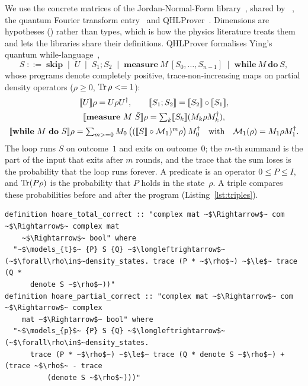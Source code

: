 We use the concrete matrices of the Jordan-Normal-Form library~\cite{thiemann2015jnf}, shared by
\IMD~\cite{bordg2021imd,bordg2020afp}, the quantum Fourier transform entry~\cite{manrique2025qft} and
QHLProver~\cite{liu2019qhl,liu2019afp}. Dimensions are hypotheses ()
rather than types, which is how the physics literature treats them and lets the libraries share
their definitions. QHLProver formalises Ying's quantum while-language~\cite{ying2011,ying2016book},
\[
S \;::=\; \mathbf{skip} \;\mid\; U \;\mid\; S_1;S_2 \;\mid\; \mathbf{measure}\ M\ [S_0,\dots,S_{n-1}]
\;\mid\; \mathbf{while}\ M\ \mathbf{do}\ S ,
\]
whose programs denote completely positive, trace-non-increasing maps on partial density operators
($\rho\ge0$, $\operatorname{Tr}\rho<=1$):
\begin{gather*}
\sem{U}\rho=U\rho U^\dagger,\qquad \sem{S_1;S_2}=\sem{S_2}\circ\sem{S_1},\\
\sem{\mathbf{measure}\ M\ \bar S}\rho=\textstyle\sum_k\sem{S_k}(M_k\rho M_k^\dagger),\\
\sem{\mathbf{while}\ M\ \mathbf{do}\ S}\rho=\textstyle\sum_{m\ge0}M_0\,\bigl((\sem S\circ\mathcal
M_1)^m\rho\bigr)\,M_0^\dagger\quad\text{with}\quad\mathcal M_1(\rho)=M_1\rho M_1^\dagger .
\end{gather*}
The loop runs $S$ on outcome~$1$ and exits on outcome~$0$; the $m$-th summand is the part of the input
that exits after $m$ rounds, and the trace that the sum loses is the probability that the loop runs
forever. A predicate is an operator $0\le P\le I$, and $\operatorname{Tr}(P\rho)$ is the probability that $P$ holds in the state~$\rho$. A triple
compares these probabilities before and after the program (Listing~\ref{lst:triples}).

\begin{lstlisting}[float=tp,caption={Triples in QHLProver (in the locale \isa{state\_sig} of the registers, of
total dimension \isa{d}; syntax annotations omitted)},label={lst:triples}]
definition hoare_total_correct :: "complex mat ~$\Rightarrow$~ com ~$\Rightarrow$~ complex mat
    ~$\Rightarrow$~ bool" where
  "~$\models_{t}$~ {P} S {Q} ~$\longleftrightarrow$~ (~$\forall\rho\in$~density_states. trace (P * ~$\rho$~) ~$\le$~ trace (Q *
      denote S ~$\rho$~))"
definition hoare_partial_correct :: "complex mat ~$\Rightarrow$~ com ~$\Rightarrow$~ complex
    mat ~$\Rightarrow$~ bool" where
  "~$\models_{p}$~ {P} S {Q} ~$\longleftrightarrow$~ (~$\forall\rho\in$~density_states.
      trace (P * ~$\rho$~) ~$\le$~ trace (Q * denote S ~$\rho$~) + (trace ~$\rho$~ - trace
          (denote S ~$\rho$~)))"
\end{lstlisting}

